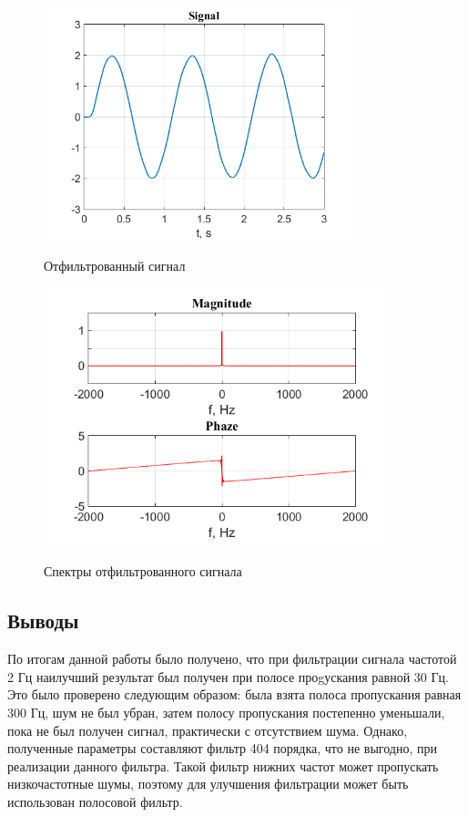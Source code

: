 \documentclass[a4paper,14pt]{article}
\begin{document}
\newpage
\begin{figure}[h]
	\begin{multicols}{1}
		\hfill
		\includegraphics[width=90mm]{filtered3}
		\hfill
		\caption{Отфильтрованный сигнал}
		\label{figBottom}
		\hfill
		\includegraphics[width=100mm]{filtered_spec3}
		\hfill
		\caption{Спектры отфильтрованного сигнала}
		\label{figDown}
	\end{multicols}
\end{figure}

\subsection{Выводы}
\hspace{0,5cm}По итогам данной работы было получено, что при фильтрации сигнала частотой 2 Гц наилучший результат был получен при полосе проgускания равной 30 Гц. Это было проверено следующим образом: была взята полоса пропускания равная 300 Гц,  шум не был убран, затем полосу пропускания постепенно уменьшали, пока не был получен сигнал, практически с отсутствием шума. Однако, полученные параметры составляют фильтр 404 порядка, что не выгодно, при реализации данного фильтра. Такой фильтр нижних частот может пропускать низкочастотные шумы, поэтому для улучшения фильтрации может быть использован полосовой фильтр.
\end{document}
